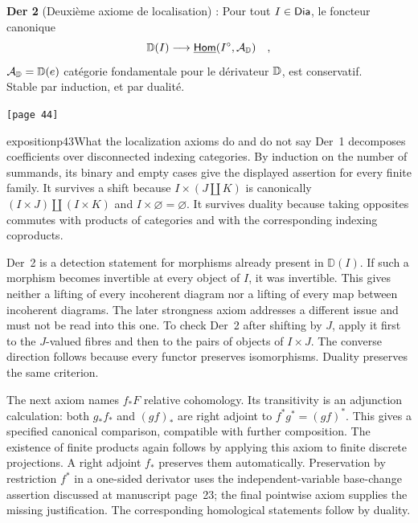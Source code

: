 
\noindent\textbf{Der 2} (Deuxième axiome de localisation) : Pour tout $I \in \mathsf{Dia}$, le foncteur canonique
\[ \mathbb{D}(I) \longrightarrow \underline{\mathsf{Hom}}(I^{\circ}, \mathcal{A}_{\mathbb{D}}) \quad , \]
$\mathcal{A}_{\mathbb{D}} = \mathbb{D}(e)$ catégorie fondamentale pour le dérivateur $\mathbb{D}$, est conservatif.\\
Stable par induction, et par dualité.

\noindent{}\texttt{[page 44]}

\begin{dcomment}{exposition}{p43}{What the localization axioms do and do not say}
Der~1 decomposes coefficients over disconnected indexing categories.
By induction on the number of summands, its binary and empty cases give
the displayed assertion for every finite family. It survives a shift
because $I\times(J\amalg K)$ is canonically
$(I\times J)\amalg(I\times K)$ and $I\times\varnothing=\varnothing$.
It survives duality because taking opposites commutes with products of
categories and with the corresponding indexing coproducts.

Der~2 is a detection statement for morphisms already present in
$\mathbb D(I)$. If such a morphism becomes invertible at every object
of $I$, it was invertible. This gives neither a lifting of every
incoherent diagram nor a lifting of every map between incoherent
diagrams. The later strongness axiom addresses a different issue and
must not be read into this one. To check Der~2 after shifting by $J$,
apply it first to the $J$-valued fibres and then to the pairs of
objects of $I\times J$. The converse direction follows because every
functor preserves isomorphisms. Duality preserves the same criterion.

The next axiom names $f_*F$ relative cohomology. Its transitivity is an
adjunction calculation: both $g_*f_*$ and $(gf)_*$ are right adjoint
to $f^*g^*=(gf)^*$. This gives a specified canonical comparison,
compatible with further composition. The existence of finite products
again follows by applying this axiom to finite discrete projections.
A right adjoint $f_*$ preserves them automatically. Preservation by
restriction $f^*$ in a one-sided derivator uses the independent-variable
base-change assertion discussed at manuscript page~23; the final
pointwise axiom supplies the missing justification. The corresponding
homological statements follow by duality.
\end{dcomment}


